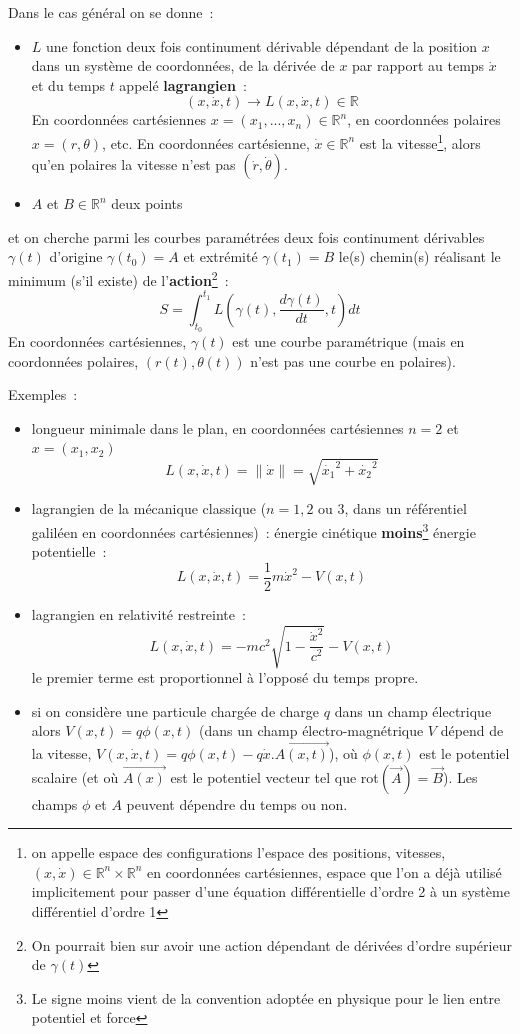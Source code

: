 \documentclass[a4paper,11pt]{book}
\begin{document}
\begin{giacjshere}
Dans le cas g\'en\'eral on se donne~:
\begin{itemize}
\item $L$ une fonction deux fois continument d\'erivable
d\'ependant de la position $x$ dans un
syst\`eme de coordonn\'ees, de la d\'eriv\'ee de $x$ par rapport au 
temps $\dot{x}$ et du temps $t$ appel\'e
{\bf lagrangien}~:
$$(x,\dot{x},t) \rightarrow L(x,\dot{x},t) \in \mathbb{R} $$ 
En coordonn\'ees cart\'esiennes $x=(x_1,...,x_n)\in \mathbb{R}^n$,
en coordonn\'ees polaires $x=(r,\theta)$, etc.
En coordonn\'ees cart\'esienne, 
$\dot{x}\in \mathbb{R}^n$ est la vitesse\footnote{on appelle espace
des configurations l'espace des positions, vitesses,
$(x,\dot{x}) \in \mathbb{R}^n \times \mathbb{R}^n$ en coordonn\'ees cart\'esiennes,
espace que l'on a d\'ej\`a utilis\'e implicitement pour passer d'une
\'equation diff\'erentielle d'ordre 2 \`a un syst\`eme diff\'erentiel
d'ordre 1}, alors qu'en polaires la vitesse n'est pas 
$(\dot{r},\dot{\theta})$.
\item $A$ et $B \in \mathbb{R}^n$ deux points
\end{itemize}
et on cherche parmi les courbes param\'etr\'ees
deux fois continument d\'erivables
$\gamma(t)$ d'origine $\gamma(t_0)=A$ 
et extr\'emit\'e $\gamma(t_1)=B$ le(s) chemin(s) r\'ealisant le
minimum (s'il existe) de l'{\bf action}\footnote{On
pourrait bien sur avoir une action d\'ependant de d\'eriv\'ees
d'ordre sup\'erieur de $\gamma(t)$}~:
$$ S=\int_{t_0}^{t_1} L(\gamma(t),\frac{d\gamma(t)}{dt},t) dt $$
En coordonn\'ees cart\'esiennes, $\gamma(t)$ est une courbe
param\'etrique (mais en coordonn\'ees polaires, $(r(t),\theta(t))$
n'est pas une courbe en polaires).

Exemples~: 
\begin{itemize}
\item
longueur minimale dans le plan, en coordonn\'ees cart\'esiennes $n=2$ 
et $x=(x_1,x_2)$
$$L(x,\dot{x},t)=\| \dot{x} \|=\sqrt{\dot{x_1}^2+\dot{x_2}^2}$$
\item lagrangien de la m\'ecanique classique ($n=1,2$ ou 3, dans un
  r\'ef\'erentiel galil\'een en coordonn\'ees cart\'esiennes)~: 
\'energie cin\'etique 
{\bf moins}\footnote{Le signe moins vient de la convention adopt\'ee
en physique pour le lien entre potentiel et force}
\'energie potentielle~:
$$L(x,\dot{x},t)=\frac{1}{2}m\dot{x}^2-V(x,t)$$
\item lagrangien en relativit\'e restreinte~:
$$ L(x,\dot{x},t)=-mc^2\sqrt{1-\frac{\dot{x}^2}{c^2}}-V(x,t)$$
le premier terme est proportionnel \`a l'oppos\'e du temps propre.
\item si on consid\`ere une particule charg\'ee de charge $q$
dans un champ \'electrique alors $V(x,t)=q\phi(x,t)$
(dans un champ \'electro-magn\'etrique $V$ d\'epend
de la vitesse, $V(x,\dot{x},t)=q\phi(x,t)-q
\dot{x}.\overrightarrow{A(x,t)}$), o\`u $\phi(x,t)$ est le potentiel
scalaire (et o\`u $\overrightarrow{A(x)}$ est
le potentiel vecteur tel que
rot$(\overrightarrow{A})=\overrightarrow{B}$).
Les champs $\phi$ et $A$ peuvent d\'ependre du temps ou non.
\end{itemize}


\end{giacjshere}
\end{document}
